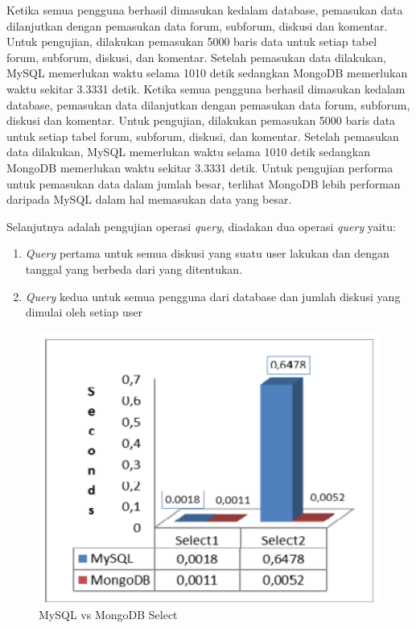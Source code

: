 Ketika semua pengguna berhasil dimasukan kedalam database, pemasukan data dilanjutkan dengan pemasukan data forum, subforum, diskusi dan komentar. Untuk pengujian, dilakukan pemasukan 5000 baris data untuk setiap tabel forum, subforum, diskusi, dan komentar. Setelah pemasukan data dilakukan, MySQL memerlukan waktu selama 1010 detik sedangkan MongoDB memerlukan waktu sekitar 3.3331 detik. Ketika semua pengguna berhasil dimasukan kedalam database, pemasukan data dilanjutkan dengan pemasukan data forum, subforum, diskusi dan komentar. Untuk pengujian, dilakukan pemasukan 5000 baris data untuk setiap tabel forum, subforum, diskusi, dan komentar. Setelah pemasukan data dilakukan, MySQL memerlukan waktu selama 1010 detik sedangkan MongoDB memerlukan waktu sekitar 3.3331 detik. Untuk pengujian performa untuk pemasukan data dalam jumlah besar, terlihat MongoDB lebih performan daripada MySQL dalam hal memasukan data yang besar.

Selanjutnya adalah pengujian operasi \textit{query}, diadakan dua operasi \textit{query} yaitu:
\begin{enumerate}
	\item {\textit{Query} pertama untuk semua diskusi yang suatu user lakukan dan dengan tanggal yang berbeda dari yang ditentukan.}
	\item {\textit{Query} kedua untuk semua pengguna dari database dan jumlah diskusi yang dimulai oleh setiap user}
\end{enumerate}

\begin{figure}[H]
	\centering
	\includegraphics[keepaspectratio, width=12cm]{gambar/2-grafik-mongomysql-2}
	\caption{MySQL vs MongoDB Select}
	\label{gambar:2-grafik-mongomysql-2}
\end{figure}

